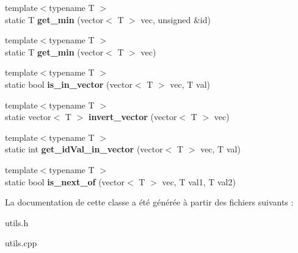 \begin{DoxyCompactItemize}
\mbox{\label{classUtils_a7ef3d8b21a8884f4e277f26b3a7cf1a1}} 
{\footnotesize template$<$typename T $>$ }\\static T {\bfseries get\+\_\+min} (vector$<$ T $>$ vec, unsigned \&id)
\item 
\mbox{\label{classUtils_a2f8c070b23499f6ade103e2972ab531b}} 
{\footnotesize template$<$typename T $>$ }\\static T {\bfseries get\+\_\+min} (vector$<$ T $>$ vec)
\item 
\mbox{\label{classUtils_ad026e29af0ede777b24e0f6a04d9910c}} 
{\footnotesize template$<$typename T $>$ }\\static bool {\bfseries is\+\_\+in\+\_\+vector} (vector$<$ T $>$ vec, T val)
\item 
\mbox{\label{classUtils_a3a27ea80e18e5e94a0da38049632310e}} 
{\footnotesize template$<$typename T $>$ }\\static vector$<$ T $>$ {\bfseries invert\+\_\+vector} (vector$<$ T $>$ vec)
\item 
\mbox{\label{classUtils_a336f5dd5c5eb457e592faa492814aff8}} 
{\footnotesize template$<$typename T $>$ }\\static int {\bfseries get\+\_\+id\+Val\+\_\+in\+\_\+vector} (vector$<$ T $>$ vec, T val)
\item 
\mbox{\label{classUtils_a40286caf5648490abfb2cf302d667161}} 
{\footnotesize template$<$typename T $>$ }\\static bool {\bfseries is\+\_\+next\+\_\+of} (vector$<$ T $>$ vec, T val1, T val2)
\end{DoxyCompactItemize}


La documentation de cette classe a été générée à partir des fichiers suivants \+:\begin{DoxyCompactItemize}
\item 
utils.\+h\item 
utils.\+cpp\end{DoxyCompactItemize}
